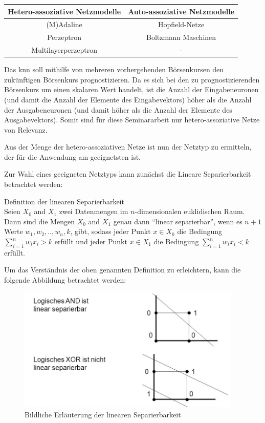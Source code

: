 \begin{center}
\begin{tabular}{|c|c|}
\hline 
\textbf{Hetero-assoziative Netzmodelle} & \textbf{Auto-assoziative Netzmodelle} \\ 
\hline 
(M)Adaline & Hopfield-Netze \\ 
\hline  
Perzeptron &  Boltzmann Maschinen \\ 
\hline 
Multilayerperzeptron & - \\ 
\hline 
\end{tabular} 
\end{center}

Das \acs{knn} soll mithilfe von mehreren vorhergehenden Börsenkursen den zukünftigen Börsenkurs prognostizieren. Da es sich bei den zu prognostizierenden Börsenkurs um einen skalaren Wert handelt, ist die Anzahl der Eingabeneuronen (und damit die Anzahl der Elemente des Eingabevektors) höher als die Anzahl der Ausgabeneuronen (und damit höher als die Anzahl der Elemente des Ausgabevektors). Somit sind für diese Seminararbeit nur hetero-assoziative Netze von Relevanz.

Aus der Menge der hetero-assoziativen Netze ist nun der Netztyp zu ermitteln, der für die Anwendung am geeignetsten ist.

Zur Wahl eines geeigneten Netztyps kann zunächst die Lineare Separierbarkeit betrachtet werden:

\begin{defi}Definition der linearen Separierbarkeit\\
Seien $X_{0}$ and $X_{1}$ zwei Datenmengen im $n$-dimensionalen euklidischen Raum. Dann sind die Mengen $X_{0}$ and $X_{1}$ genau dann  "`linear separierbar"', wenn es  $n+1$ Werte $w_{1}, w_{2},..,w_{n}, k$, gibt, sodass jeder Punkt  $x \in X_{0}$ die Bedingung $\sum^{n}_{i=1} w_{i}x_{i} > k$ erfüllt und jeder Punkt $x \in X_{1}$ die Bedingung $\sum^{n}_{i=1} w_{i}x_{i} < k$ erfüllt.
\end{defi}

Um das Verständnis der oben genannten Definition zu erleichtern, kann die folgende Abbildung betrachtet werden:

\begin{figure}[H]
\centering
		\includegraphics[width=0.95\textwidth]{Linear_Sep.PNG}
	\caption{Bildliche Erläuterung der linearen Separierbarkeit}
	\label{fig:Bildliche Erläuterung der linearen Separierbarkeit}
\end{figure}

